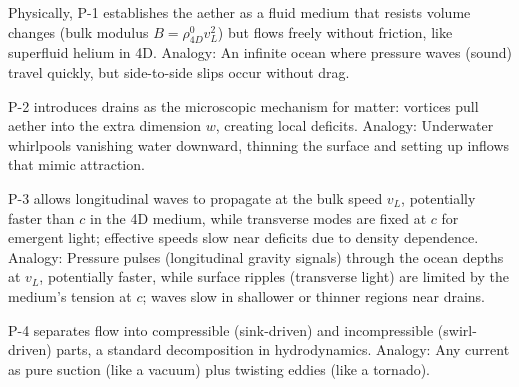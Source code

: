 
Physically, P-1 establishes the aether as a fluid medium that resists volume changes (bulk modulus $B = \rho_{4D}^0 v_L^2$) but flows freely without friction, like superfluid helium in 4D. Analogy: An infinite ocean where pressure waves (sound) travel quickly, but side-to-side slips occur without drag.

P-2 introduces drains as the microscopic mechanism for matter: vortices pull aether into the extra dimension $w$, creating local deficits. Analogy: Underwater whirlpools vanishing water downward, thinning the surface and setting up inflows that mimic attraction.

P-3 allows longitudinal waves to propagate at the bulk speed $v_L$, potentially faster than $c$ in the 4D medium, while transverse modes are fixed at $c$ for emergent light; effective speeds slow near deficits due to density dependence. Analogy: Pressure pulses (longitudinal gravity signals) through the ocean depths at $v_L$, potentially faster, while surface ripples (transverse light) are limited by the medium's tension at $c$; waves slow in shallower or thinner regions near drains.

P-4 separates flow into compressible (sink-driven) and incompressible (swirl-driven) parts, a standard decomposition in hydrodynamics. Analogy: Any current as pure suction (like a vacuum) plus twisting eddies (like a tornado).

